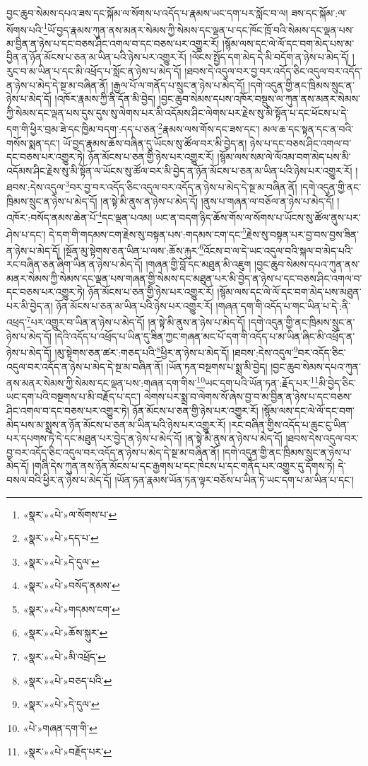 བྱང་ཆུབ་སེམས་དཔའ་ཟས་དང་སྐོམ་ལ་སོགས་པ་འདོད་པ་རྣམས་ཡང་དག་པར་སློང་བ་ལ། ཟས་དང་སྐོམ་:ལ་སོགས་པའི་\footnote{«སྣར་»«པེ་»ལ་སོགས་པ་}ཡོ་བྱད་རྣམས་ཀུན་ནས་མནར་སེམས་ཀྱི་སེམས་དང་ལྡན་པ་དང་ཁོང་ཁྲོ་བའི་སེམས་དང་ལྡན་པས་མ་བྱིན་ན་ཉེས་པ་དང་བཅས་ཤིང་འགལ་བ་དང་བཅས་པར་འགྱུར་རོ། །སྙོམ་ལས་དང་ལེ་ལོ་དང་བག་མེད་པས་མ་བྱིན་ན་ཉོན་མོངས་པ་ཅན་མ་ཡིན་པའི་ཉེས་པར་འགྱུར་རོ། །ལོངས་སྤྱོད་དག་མེད་དེ་མི་བདོག་ན་ཉེས་པ་མེད་དོ། །རུང་བ་མ་ཡིན་པ་དང་མི་འཕྲོད་པ་སློང་ན་ཉེས་པ་མེད་དོ། །ཐབས་དེ་འདུལ་བར་བྱ་བར་འདོད་ཅིང་འདུལ་བར་འདོད་ན་ཉེས་པ་མེད་དེ་སྔ་མ་བཞིན་ནོ། །རྒྱལ་པོ་ལ་གནོད་པ་སྲུང་ན་ཉེས་པ་མེད་དོ། །དགེ་འདུན་གྱི་ནང་ཁྲིམས་སྲུང་ན་ཉེས་པ་མེད་དོ། །འཁོར་རྣམས་ཀྱི་ནི་དོན་མི་བྱེད། །བྱང་ཆུབ་སེམས་དཔས་འཁོར་བསྡུས་ལ་ཀུན་ནས་མནར་སེམས་ཀྱི་སེམས་དང་ལྡན་པས་དུས་དུས་སུ་ལེགས་པར་མི་འདོམས་ཤིང་ལེགས་པར་རྗེས་སུ་མི་སྟོན་པ་དང་ཕོངས་པ་དེ་དག་གི་ཕྱིར་བྲམ་ཟེ་དང་ཁྱིམ་བདག་:དད་པ་ཅན་\footnote{«སྣར་»«པེ་»དད་པ་}རྣམས་ལས་གོས་དང་ཟས་དང་། མལ་ཆ་དང་སྟན་དང་ན་བའི་གསོས་སྨན་དང་། ཡོ་བྱད་རྣམས་ཆོས་བཞིན་དུ་ཡོངས་སུ་ཚོལ་བར་མི་བྱེད་ན། ཉེས་པ་དང་བཅས་ཤིང་འགལ་བ་དང་བཅས་པར་འགྱུར་ཏེ། ཉོན་མོངས་པ་ཅན་གྱི་ཉེས་པར་འགྱུར་རོ། །སྙོམ་ལས་སམ་ལེ་ལོའམ་བག་མེད་པས་མི་འདོམས་ཤིང་རྗེས་སུ་མི་སྟོན་ལ་ཡོངས་སུ་ཚོལ་བར་མི་བྱེད་ན་ཉོན་མོངས་པ་ཅན་མ་ཡིན་པའི་ཉེས་པར་འགྱུར་རོ། །ཐབས་:དེས་འདུལ་\footnote{«སྣར་»«པེ་»དེ་དུལ་}བར་བྱ་བར་འདོད་ཅིང་འདུལ་བར་འདོད་ན་ཉེས་པ་མེད་དེ་སྔ་མ་བཞིན་ནོ། །དགེ་འདུན་གྱི་ནང་ཁྲིམས་སྲུང་ན་ཉེས་པ་མེད་དོ། །ན་སྟེ་མི་ནུས་ན་ཉེས་པ་མེད་དོ། །ནུས་པ་གཞན་ལ་བཅོལ་ན་ཉེས་པ་མེད་དོ། །འཁོར་:བསོད་ནམས་ཆེན་པོ་\footnote{«སྣར་»«པེ་»བསོད་ནམས་}དང་ལྡན་པའམ། ཡང་ན་བདག་ཉིད་ཆོས་གོས་ལ་སོགས་པ་ཡོངས་སུ་ཚོལ་ནུས་པར་ཤེས་པ་དང་། དེ་དག་གི་གདམས་ངག་རྗེས་སུ་བསྟན་པས་:གདམས་ངག་དང་\footnote{«སྣར་»«པེ་»གདམས་ངག་}རྗེས་སུ་བསྟན་པར་བྱ་བས་བྱས་ཟིན་ན་ཉེས་པ་མེད་དོ། །སྔོན་མུ་སྟེགས་ཅན་ཡིན་པ་ལས་:ཆོས་རྐུར་\footnote{«སྣར་»«པེ་»ཆོས་སྐུར་}འོངས་བ་ལ་དེ་ཡང་འདུལ་བའི་སྐལ་བ་མེད་པའི་རང་བཞིན་ཅན་ཞིག་ཡིན་ན་ཉེས་པ་མེད་དོ། །གཞན་གྱི་བློ་དང་མཐུན་མི་འཇུག །བྱང་ཆུབ་སེམས་དཔའ་ཀུན་ནས་མནར་སེམས་ཀྱི་སེམས་དང་ལྡན་པས་གཞན་གྱི་སེམས་དང་མཐུན་པར་མི་བྱེད་ན་ཉེས་པ་དང་བཅས་ཤིང་འགལ་བ་དང་བཅས་པར་འགྱུར་ཏེ། ཉོན་མོངས་པ་ཅན་གྱི་ཉེས་པར་འགྱུར་རོ། །སྙོམ་ལས་དང་ལེ་ལོ་དང་བག་མེད་པས་མཐུན་པར་མི་བྱེད་ན། ཉོན་མོངས་པ་ཅན་མ་ཡིན་པའི་ཉེས་པར་འགྱུར་རོ། །གཞན་དག་གི་འདོད་པ་གང་ཡིན་པ་དེ་:ནི་འཕྲད་\footnote{«སྣར་»«པེ་»མི་འཕྲོད་}པར་འགྱུར་བ་ཡིན་ན་ཉེས་པ་མེད་དོ། །ན་སྟེ་མི་ནུས་ན་ཉེས་པ་མེད་དོ། །དགེ་འདུན་གྱི་ནང་ཁྲིམས་སྲུང་ན་ཉེས་པ་མེད་དོ། །དེའི་འདོད་པ་འཕྲོད་པ་ཡིན་དུ་ཟིན་ཀྱང་གཞན་མང་པོ་དག་གི་འདོད་པ་མ་ཡིན་ཞིང་མི་འཕྲོད་ན་ཉེས་པ་མེད་དོ། །མུ་སྟེགས་ཅན་ཚར་:གཅད་པའི་\footnote{«སྣར་»«པེ་»བཅད་པའི་}ཕྱིར་ན་ཉེས་པ་མེད་དོ། །ཐབས་:དེས་འདུལ་\footnote{«སྣར་»«པེ་»དེ་དུལ་}བར་འདོད་ཅིང་འདུལ་བར་འདོད་ན་ཉེས་པ་མེད་དེ་སྔ་མ་བཞིན་ནོ། །ཡོན་ཏན་བསྔགས་པ་སྨྲ་མི་བྱེད། །བྱང་ཆུབ་སེམས་དཔའ་ཀུན་ནས་མནར་སེམས་ཀྱི་སེམས་དང་ལྡན་པས་:གཞན་དག་གིས་\footnote{«པེ་»གཞན་དག་གི་}ཡང་དག་པའི་ཡོན་ཏན་:རྗོད་པར་\footnote{«སྣར་»«པེ་»བརྗོད་པར་}མི་བྱེད་ཅིང་ཡང་དག་པའི་བསྔགས་པ་མི་བརྗོད་པ་དང་། ལེགས་པར་སྨྲ་བ་ལེགས་སོ་ཞེས་བྱ་བ་མ་བྱིན་ན་ཉེས་པ་དང་བཅས་ཤིང་འགལ་བ་དང་བཅས་པར་འགྱུར་ཏེ། ཉོན་མོངས་པ་ཅན་གྱི་ཉེས་པར་འགྱུར་རོ། །སྙོམ་ལས་དང་ལེ་ལོ་དང་བག་མེད་པས་མ་སྨྲས་ན་ཉོན་མོངས་པ་ཅན་མ་ཡིན་པའི་ཉེས་པར་འགྱུར་རོ། །རང་བཞིན་གྱིས་འདོད་པ་ཆུང་ངུ་ཡིན་པར་དཔགས་ཏེ་དེ་དང་མཐུན་པར་བྱེད་ན་ཉེས་པ་མེད་དོ། །ན་སྟེ་མི་ནུས་ན་ཉེས་པ་མེད་དོ། །ཐབས་དེས་འདུལ་བར་བྱ་བར་འདོད་ཅིང་འདུལ་བར་འདོད་ན་ཉེས་པ་མེད་དེ་སྔ་མ་བཞིན་ནོ། །དགེ་འདུན་གྱི་ནང་ཁྲིམས་སྲུང་ན་ཉེས་པ་མེད་དོ། །གཞི་དེས་ཀུན་ནས་ཉོན་མོངས་པ་དང་རྒྱགས་པ་དང་ཁེངས་པ་དང་གནོད་པར་འགྱུར་དུ་དོགས་ཏེ། དེ་བསལ་བའི་ཕྱིར་ན་ཉེས་པ་མེད་དོ། །ཡོན་ཏན་རྣམས་ཡོན་ཏན་ལྟར་བཅོས་པ་ཡིན་ཏེ་ཡང་དག་པ་མ་ཡིན་པ་དང་། 